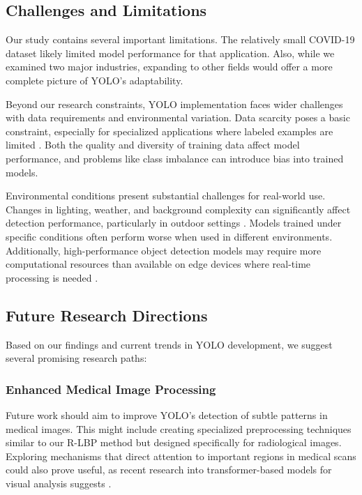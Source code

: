 \subsection{Challenges and Limitations}

Our study contains several important limitations. The relatively small COVID-19 dataset likely limited model performance for that application. Also, while we examined two major industries, expanding to other fields would offer a more complete picture of YOLO's adaptability.

Beyond our research constraints, YOLO implementation faces wider challenges with data requirements and environmental variation. Data scarcity poses a basic constraint, especially for specialized applications where labeled examples are limited \citep{Mhalla2024}. Both the quality and diversity of training data affect model performance, and problems like class imbalance can introduce bias into trained models.

Environmental conditions present substantial challenges for real-world use. Changes in lighting, weather, and background complexity can significantly affect detection performance, particularly in outdoor settings \citep{Akbar2024, Tsitos2024}. Models trained under specific conditions often perform worse when used in different environments. Additionally, high-performance object detection models may require more computational resources than available on edge devices where real-time processing is needed \citep{Kumar2024}.

\subsection{Future Research Directions}

Based on our findings and current trends in YOLO development, we suggest several promising research paths:

\subsubsection{Enhanced Medical Image Processing}
Future work should aim to improve YOLO's detection of subtle patterns in medical images. This might include creating specialized preprocessing techniques similar to our R-LBP method but designed specifically for radiological images. Exploring mechanisms that direct attention to important regions in medical scans could also prove useful, as recent research into transformer-based models for visual analysis suggests \citep{Gunawan2024}.

